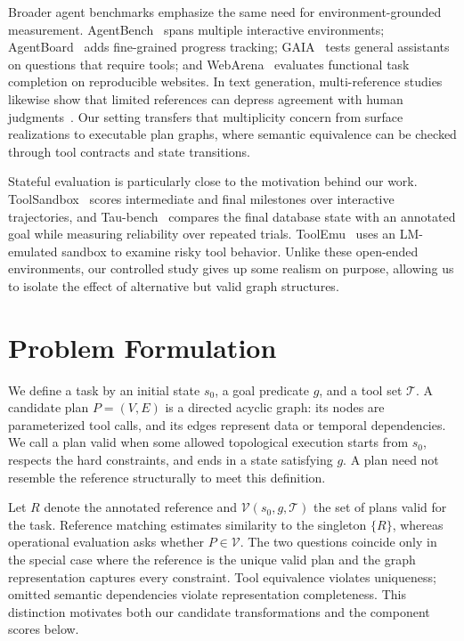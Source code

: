 \documentclass[10pt]{article}
\begin{document}
Broader agent benchmarks emphasize the same need for environment-grounded
measurement. AgentBench~\cite{liu2023agentbench} spans multiple interactive
environments; AgentBoard~\cite{ma2024agentboard} adds fine-grained progress
tracking; GAIA~\cite{mialon2024gaia} tests general assistants on questions that
require tools; and WebArena~\cite{zhou2024webarena} evaluates functional task
completion on reproducible websites. In text generation, multi-reference
studies likewise show that limited references can depress agreement with human
judgments~\cite{gupta2019multireference,tang2024divref,zeng2024multireference}.
Our setting transfers that multiplicity concern from surface realizations to
executable plan graphs, where semantic equivalence can be checked through tool
contracts and state transitions.

Stateful evaluation is particularly close to the motivation behind our work.
ToolSandbox~\cite{lu2025toolsandbox} scores intermediate and final milestones
over interactive trajectories, and Tau-bench~\cite{yao2025taubench} compares
the final database state with an annotated goal while measuring reliability
over repeated trials. ToolEmu~\cite{ruan2024toolemu} uses an LM-emulated sandbox
to examine risky tool behavior. Unlike these open-ended environments, our
controlled study gives up some realism on purpose, allowing us to isolate the
effect of alternative but valid graph structures.

\section{Problem Formulation}
We define a task by an initial state $s_0$, a goal predicate $g$, and a tool
set $\mathcal{T}$. A candidate plan $P=(V,E)$ is a directed acyclic graph:
its nodes are parameterized tool calls, and its edges represent data or
temporal dependencies. We call a plan valid when some allowed topological
execution starts from $s_0$, respects the hard constraints, and ends in a
state satisfying $g$. A plan need not resemble the reference structurally to
meet this definition.

Let $R$ denote the annotated reference and $\mathcal{V}(s_0,g,\mathcal{T})$
the set of plans valid for the task. Reference matching estimates similarity
to the singleton $\{R\}$, whereas operational evaluation asks whether
$P\in\mathcal{V}$. The two questions coincide only in the special case where
the reference is the unique valid plan and the graph representation captures
every constraint.
Tool equivalence violates uniqueness; omitted semantic dependencies violate
representation completeness. This distinction motivates both our candidate
transformations and the component scores below.
\end{document}
